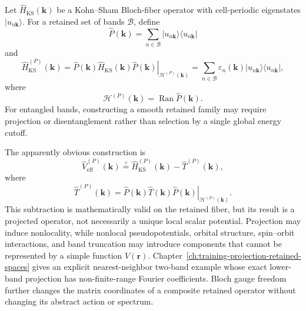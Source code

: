 Let $\hat H_{\mathrm{KS}}(\mathbf k)$ be a Kohn--Sham Bloch-fiber operator
with cell-periodic eigenstates $\lvert u_{n\mathbf k}\rangle$. For a retained
set of bands $\mathcal B$, define
\begin{equation}
    \hat P(\mathbf k)
    =
    \sum_{n\in\mathcal B}
    \lvert u_{n\mathbf k}\rangle
    \langle u_{n\mathbf k}\rvert
\end{equation}
and
\begin{equation}
    \hat H_{\mathrm{KS}}^{(P)}(\mathbf k)
    =
    \left.
        \hat P(\mathbf k)
        \hat H_{\mathrm{KS}}(\mathbf k)
        \hat P(\mathbf k)
    \right|_{\mathcal H^{(P)}(\mathbf k)}
    =
    \sum_{n\in\mathcal B}
    \varepsilon_n(\mathbf k)
    \lvert u_{n\mathbf k}\rangle
    \langle u_{n\mathbf k}\rvert,
\end{equation}
where
\begin{equation}
    \mathcal H^{(P)}(\mathbf k)
    =
    \operatorname{Ran}\hat P(\mathbf k).
\end{equation}
For entangled bands, constructing a smooth retained family may require
projection or disentanglement rather than selection by a single global energy
cutoff.

The apparently obvious construction is
\begin{equation}
    \hat V_{\mathrm{eff}}^{(P)}(\mathbf k)
    \stackrel{?}{=}
    \hat H_{\mathrm{KS}}^{(P)}(\mathbf k)
    -
    \hat T^{(P)}(\mathbf k),
\end{equation}
where
\begin{equation}
    \hat T^{(P)}(\mathbf k)
    =
    \left.
        \hat P(\mathbf k)
        \hat T(\mathbf k)
        \hat P(\mathbf k)
    \right|_{\mathcal H^{(P)}(\mathbf k)}.
\end{equation}
This subtraction is mathematically valid on the retained fiber, but its result
is a projected operator, not necessarily a unique local scalar potential.
Projection may induce nonlocality, while nonlocal pseudopotentials, orbital
structure, spin--orbit interactions, and band truncation may introduce
components that cannot be represented by a simple function $V(\mathbf r)$.
Chapter~\ref{ch:training-projection-retained-spaces} gives an explicit
nearest-neighbor two-band example whose exact lower-band projection has
non-finite-range Fourier coefficients. Bloch gauge freedom further changes the
matrix coordinates of a composite retained operator without changing its
abstract action or spectrum.


